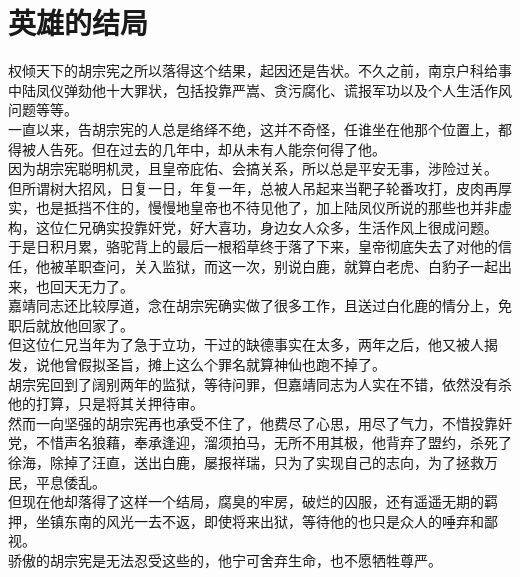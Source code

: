 \section{英雄的结局}
\ifnum{}
	\begin{multicols}{\theparacolNo}
\fi
权倾天下的胡宗宪之所以落得这个结果，起因还是告状。不久之前，南京户科给事中陆凤仪弹劾他十大罪状，包括投靠严嵩、贪污腐化、谎报军功以及个人生活作风问题等等。\\

一直以来，告胡宗宪的人总是络绎不绝，这并不奇怪，任谁坐在他那个位置上，都得被人告死。但在过去的几年中，却从未有人能奈何得了他。\\

因为胡宗宪聪明机灵，且皇帝庇佑、会搞关系，所以总是平安无事，涉险过关。\\

但所谓树大招风，日复一日，年复一年，总被人吊起来当靶子轮番攻打，皮肉再厚实，也是抵挡不住的，慢慢地皇帝也不待见他了，加上陆凤仪所说的那些也并非虚构，这位仁兄确实投靠奸党，好大喜功，身边女人众多，生活作风上很成问题。\\

于是日积月累，骆驼背上的最后一根稻草终于落了下来，皇帝彻底失去了对他的信任，他被革职查问，关入监狱，而这一次，别说白鹿，就算白老虎、白豹子一起出来，也回天无力了。\\

嘉靖同志还比较厚道，念在胡宗宪确实做了很多工作，且送过白化鹿的情分上，免职后就放他回家了。\\

但这位仁兄当年为了急于立功，干过的缺德事实在太多，两年之后，他又被人揭发，说他曾假拟圣旨，摊上这么个罪名就算神仙也跑不掉了。\\

胡宗宪回到了阔别两年的监狱，等待问罪，但嘉靖同志为人实在不错，依然没有杀他的打算，只是将其关押待审。\\

然而一向坚强的胡宗宪再也承受不住了，他费尽了心思，用尽了气力，不惜投靠奸党，不惜声名狼藉，奉承逢迎，溜须拍马，无所不用其极，他背弃了盟约，杀死了徐海，除掉了汪直，送出白鹿，屡报祥瑞，只为了实现自己的志向，为了拯救万民，平息倭乱。\\

但现在他却落得了这样一个结局，腐臭的牢房，破烂的囚服，还有遥遥无期的羁押，坐镇东南的风光一去不返，即使将来出狱，等待他的也只是众人的唾弃和鄙视。\\

骄傲的胡宗宪是无法忍受这些的，他宁可舍弃生命，也不愿牺牲尊严。\\


\end{multicols}
